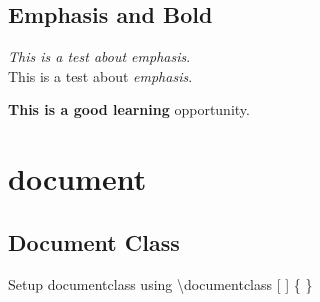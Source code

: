 \documentclass[12pt]{article}
\begin{document}
        \subsection{Emphasis and Bold}
            \textit{This is a test about \emph{emphasis}}.\\
            \indent This is a test about \emph{emphasis}.
        
            {\bfseries This is a good learning} opportunity.
    
    \section{document}
    
        \subsection{Document Class}
            Setup documentclass using \textbackslash documentclass [ ] \{ \}

            
         
            
\end{document}
